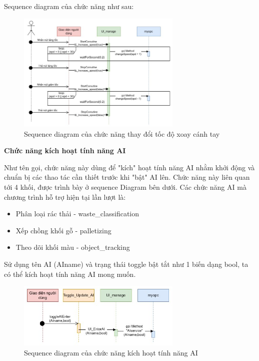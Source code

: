 Sequence diagram của chức năng như sau:

\begin{figure}[H]
    \centering
    \includegraphics[width=0.7\textwidth]{Images/Implementation/VRapp/VR_changespeed.jpg}
    \caption{Sequence diagram của chức năng thay đổi tốc độ xoay cánh tay}
    \label{fig:seq_changespeed}
\end{figure}


\textbf{Chức năng kích hoạt tính năng AI} 

Như tên gọi, chức năng này dùng để "kích" hoạt tính năng AI nhằm khởi động và chuẩn bị các thao tác cần thiết trước khi "bật" AI lên. Chức năng này liên quan tới 4 khối, được trình bày ở sequence Diagram bên dưới. Các chức năng AI mà chương trình hỗ trợ hiện tại lần lượt là:

\begin{itemize}
    \item Phân loại rác thải - waste\_classification
    \item Xếp chồng khối gỗ - palletizing
    \item Theo dõi khối màu - object\_tracking
\end{itemize}

Sử dụng tên AI (AIname) và trạng thái toggle bật tắt như 1 biến dạng bool, ta có thể kích hoạt tính năng AI mong muốn.

\begin{figure}[H]
    \centering
    \includegraphics[width=0.7\textwidth]{Images/Implementation/VRapp/VR_AIenter.jpg}
    \caption{Sequence diagram của chức năng kích hoạt tính năng AI}
    \label{fig:VR_AIenter}
\end{figure}

